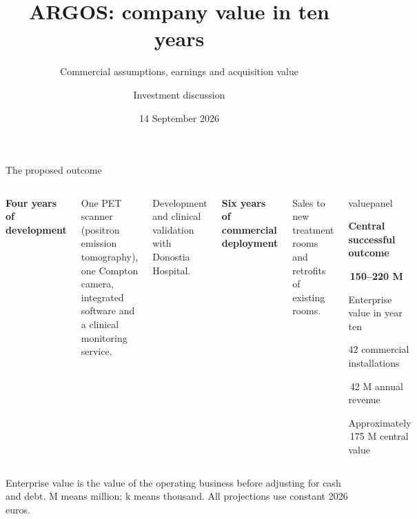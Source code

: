 \documentclass[aspectratio=169,11pt]{beamer}
\title{ARGOS: company value in ten years}
\subtitle{Commercial assumptions, earnings and acquisition value}
\author{Investment discussion}
\date{14 September 2026}
\newcommand{\gap}{\par\vspace{2mm}}
\begin{document}
{
\begin{frame}
\titlepage
\end{frame}}

\begin{frame}{The proposed outcome}

\begin{columns}[T,onlytextwidth]
{\small
\textbf{Four years of development}\gap
One PET scanner (positron emission tomography), one Compton camera, integrated software and a clinical monitoring service.\gap
Development and clinical validation with Donostia Hospital.\gap
\textbf{Six years of commercial deployment}\gap
Sales to new treatment rooms and retrofits of existing rooms.}
\begin{beamercolorbox}[sep=10pt,wd=\linewidth]{valuepanel}
{\footnotesize\bfseries Central successful outcome\par}
\vspace{3mm}
{\LARGE\bfseries\color{darkred}\EUR\,150--220 M\par}
\vspace{2mm}
{\small Enterprise value in year ten\par}
\vspace{4mm}
{\small 42 commercial installations\par
\EUR\,42 M annual revenue\par
Approximately \EUR\,175 M central value\par}
\end{beamercolorbox}
\end{columns}
\gap
{\footnotesize Enterprise value is the value of the operating business before adjusting for cash and debt.
M means million; k means thousand. All projections use constant 2026 euros.}
\end{frame}
\end{document}
